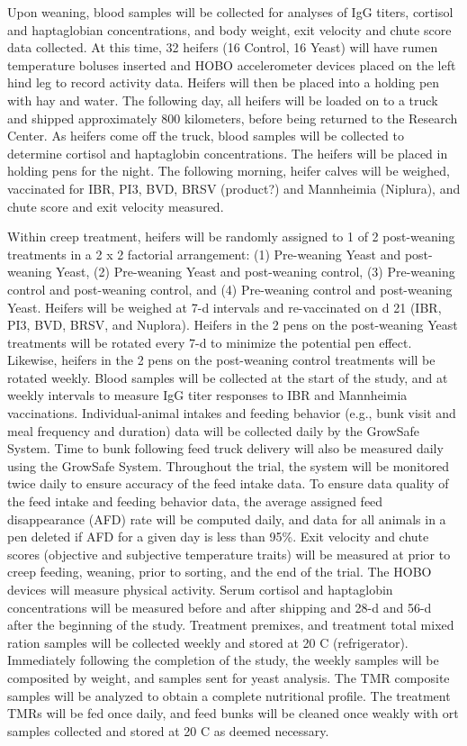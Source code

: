 \documentclass[
]{book}
\begin{document}
Upon weaning, blood samples will be collected for analyses of IgG titers, cortisol and haptaglobian concentrations, and body weight, exit velocity and chute score data collected. At this time, 32 heifers (16 Control, 16 Yeast) will have rumen temperature boluses inserted and HOBO accelerometer devices placed on the left hind leg to record activity data. Heifers will then be placed into a holding pen with hay and water. The following day, all heifers will be loaded on to a truck and shipped approximately 800 kilometers, before being returned to the Research Center. As heifers come off the truck, blood samples will be collected to determine cortisol and haptaglobin concentrations. The heifers will be placed in holding pens for the night. The following morning, heifer calves will be weighed, vaccinated for IBR, PI3, BVD, BRSV (product?) and Mannheimia (Niplura), and chute score and exit velocity measured.

Within creep treatment, heifers will be randomly assigned to 1 of 2 post-weaning treatments in a 2 x 2 factorial arrangement: (1) Pre-weaning Yeast and post-weaning Yeast, (2) Pre-weaning Yeast and post-weaning control, (3) Pre-weaning control and post-weaning control, and (4) Pre-weaning control and post-weaning Yeast. Heifers will be weighed at 7-d intervals and re-vaccinated on d 21 (IBR, PI3, BVD, BRSV, and Nuplora). Heifers in the 2 pens on the post-weaning Yeast treatments will be rotated every 7-d to minimize the potential pen effect. Likewise, heifers in the 2 pens on the post-weaning control treatments will be rotated weekly. Blood samples will be collected at the start of the study, and at weekly intervals to measure IgG titer responses to IBR and Mannheimia vaccinations. Individual-animal intakes and feeding behavior (e.g., bunk visit and meal frequency and duration) data will be collected daily by the GrowSafe System. Time to bunk following feed truck delivery will also be measured daily using the GrowSafe System. Throughout the trial, the system will be monitored twice daily to ensure accuracy of the feed intake data. To ensure data quality of the feed intake and feeding behavior data, the average assigned feed disappearance (AFD) rate will be computed daily, and data for all animals in a pen deleted if AFD for a given day is less than 95\%. Exit velocity and chute scores (objective and subjective temperature traits) will be measured at prior to creep feeding, weaning, prior to sorting, and the end of the trial. The HOBO devices will measure physical activity. Serum cortisol and haptaglobin concentrations will be measured before and after shipping and 28-d and 56-d after the beginning of the study. Treatment premixes, and treatment total mixed ration samples will be collected weekly and stored at 20 C (refrigerator). Immediately following the completion of the study, the weekly samples will be composited by weight, and samples sent for yeast analysis. The TMR composite samples will be analyzed to obtain a complete nutritional profile. The treatment TMRs will be fed once daily, and feed bunks will be cleaned once weakly with ort samples collected and stored at 20 C as deemed necessary.
\end{document}
